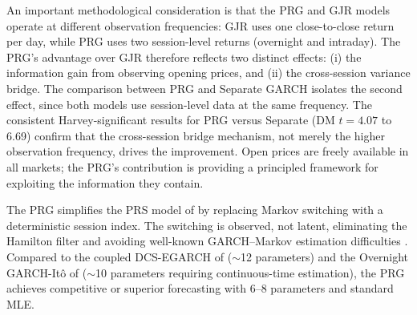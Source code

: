 \documentclass[11pt,a4paper]{article}
\begin{document}
An important methodological consideration is that the PRG and GJR models operate at different observation frequencies: GJR uses one close-to-close return per day, while PRG uses two session-level returns (overnight and intraday). The PRG's advantage over GJR therefore reflects two distinct effects: (i) the information gain from observing opening prices, and (ii) the cross-session variance bridge. The comparison between PRG and Separate GARCH isolates the second effect, since both models use session-level data at the same frequency. The consistent Harvey-significant results for PRG versus Separate (DM $t = 4.07$ to 6.69) confirm that the cross-session bridge mechanism, not merely the higher observation frequency, drives the improvement. Open prices are freely available in all markets; the PRG's contribution is providing a principled framework for exploiting the information they contain.

The PRG simplifies the PRS model of \citet{Lai2024} by replacing Markov switching with a deterministic session index. The switching is observed, not latent, eliminating the Hamilton filter and avoiding well-known GARCH--Markov estimation difficulties \citep{Haas2004}. Compared to the coupled DCS-EGARCH of \citet{Linton2020} ($\sim$12 parameters) and the Overnight GARCH-It\^{o} of \citet{Kim2023} ($\sim$10 parameters requiring continuous-time estimation), the PRG achieves competitive or superior forecasting with 6--8 parameters and standard MLE.
\end{document}
